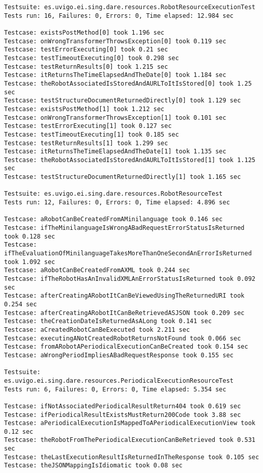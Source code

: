 \begin{table}[hbp]
\begingroup
  \fontsize{9pt}{11pt}\selectfont
\begin{verbatim}
Testsuite: es.uvigo.ei.sing.dare.resources.RobotResourceExecutionTest
Tests run: 16, Failures: 0, Errors: 0, Time elapsed: 12.984 sec

Testcase: existsPostMethod[0] took 1.196 sec
Testcase: onWrongTransformerThrowsException[0] took 0.119 sec
Testcase: testErrorExecuting[0] took 0.21 sec
Testcase: testTimeoutExecuting[0] took 0.298 sec
Testcase: testReturnResults[0] took 1.215 sec
Testcase: itReturnsTheTimeElapsedAndTheDate[0] took 1.184 sec
Testcase: theRobotAssociatedIsStoredAndAURLToItIsStored[0] took 1.25 sec
Testcase: testStructureDocumentReturnedDirectly[0] took 1.129 sec
Testcase: existsPostMethod[1] took 1.212 sec
Testcase: onWrongTransformerThrowsException[1] took 0.101 sec
Testcase: testErrorExecuting[1] took 0.127 sec
Testcase: testTimeoutExecuting[1] took 0.185 sec
Testcase: testReturnResults[1] took 1.299 sec
Testcase: itReturnsTheTimeElapsedAndTheDate[1] took 1.135 sec
Testcase: theRobotAssociatedIsStoredAndAURLToItIsStored[1] took 1.125 sec
Testcase: testStructureDocumentReturnedDirectly[1] took 1.165 sec

Testsuite: es.uvigo.ei.sing.dare.resources.RobotResourceTest
Tests run: 12, Failures: 0, Errors: 0, Time elapsed: 4.896 sec

Testcase: aRobotCanBeCreatedFromAMinilanguage took 0.146 sec
Testcase: ifTheMinilanguageIsWrongABadRequestErrorStatusIsReturned took 0.128 sec
Testcase: ifTheEvaluationOfMinilanguageTakesMoreThanOneSecondAnErrorIsReturned took 1.092 sec
Testcase: aRobotCanBeCreatedFromAXML took 0.244 sec
Testcase: ifTheRobotHasAnInvalidXMLAnErrorStatusIsReturned took 0.092 sec
Testcase: afterCreatingARobotItCanBeViewedUsingTheReturnedURI took 0.254 sec
Testcase: afterCreatingARobotItCanBeRetrievedASJSON took 0.209 sec
Testcase: theCreationDateIsReturnedAsALong took 0.141 sec
Testcase: aCreatedRobotCanBeExecuted took 2.211 sec
Testcase: executingANotCreatedRobotReturnsNotFound took 0.066 sec
Testcase: fromARobotAPeriodicalExecutionCanBeCreated took 0.154 sec
Testcase: aWrongPeriodImpliesABadRequestResponse took 0.155 sec

Testsuite: es.uvigo.ei.sing.dare.resources.PeriodicalExecutionResourceTest
Tests run: 6, Failures: 0, Errors: 0, Time elapsed: 5.354 sec

Testcase: ifNotAssociatedPeriodicalResultReturn404 took 0.619 sec
Testcase: ifPeriodicalResultExistsMustReturn200Code took 3.88 sec
Testcase: aPeriodicalExecutionIsMappedToAPeriodicalExecutionView took 0.12 sec
Testcase: theRobotFromThePeriodicalExecutionCanBeRetrieved took 0.531 sec
Testcase: theLastExecutionResultIsReturnedInTheResponse took 0.105 sec
Testcase: theJSONMappingIsIdiomatic took 0.08 sec
\end{verbatim}
\endgroup
\caption{Junit Test DARE-Java}
\label{junit_dare-java}
\end{table}

